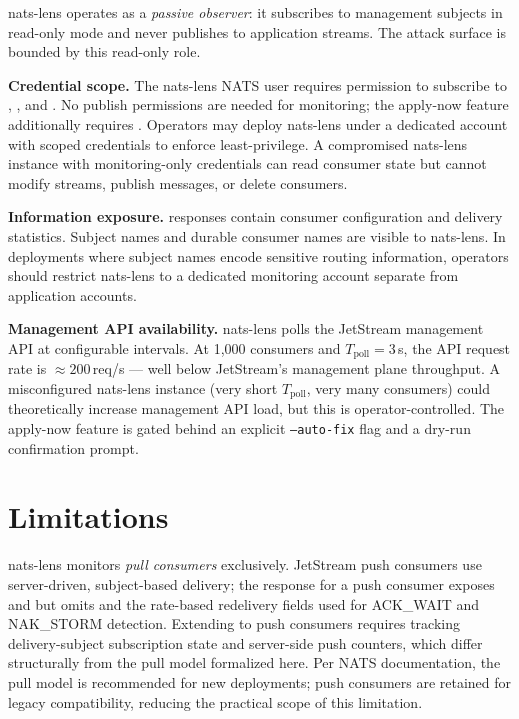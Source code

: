 \documentclass[journal]{IEEEtran}
\begin{document}
nats-lens operates as a \emph{passive observer}: it subscribes to
 management subjects in read-only mode and never
publishes to application streams. The attack surface is bounded by
this read-only role.

\textbf{Credential scope.} The nats-lens NATS user requires permission
to subscribe to , ,
and . No publish permissions are needed
for monitoring; the apply-now feature additionally requires
. Operators may deploy nats-lens under
a dedicated account with scoped credentials to enforce least-privilege.
A compromised nats-lens instance with monitoring-only credentials can
read consumer state but cannot modify streams, publish messages, or
delete consumers.

\textbf{Information exposure.}  responses contain
consumer configuration and delivery statistics. Subject names and durable
consumer names are visible to nats-lens. In deployments where subject names
encode sensitive routing information, operators should restrict nats-lens
to a dedicated monitoring account separate from application accounts.

\textbf{Management API availability.} nats-lens polls the JetStream
management API at configurable intervals. At 1,000 consumers and
$T_\text{poll}{=}3$\,s, the API request rate is $\approx 200$\,req/s ---
well below JetStream's management plane throughput. A misconfigured
nats-lens instance (very short $T_\text{poll}$, very many consumers)
could theoretically increase management API load, but this is
operator-controlled. The apply-now feature is gated behind an explicit
\texttt{--auto-fix} flag and a dry-run confirmation prompt.

\section{Limitations}
\label{sec:limitations}

nats-lens monitors \emph{pull consumers} exclusively. JetStream push
consumers use server-driven, subject-based delivery; the
 response for a push consumer exposes
 and  but omits
 and the rate-based redelivery fields used
for ACK\_WAIT and NAK\_STORM detection.
Extending to push consumers requires tracking delivery-subject subscription
state and server-side push counters, which differ structurally from the
pull model formalized here. Per NATS documentation, the pull model is
recommended for new deployments; push consumers are retained for legacy
compatibility, reducing the practical scope of this limitation.
\end{document}
